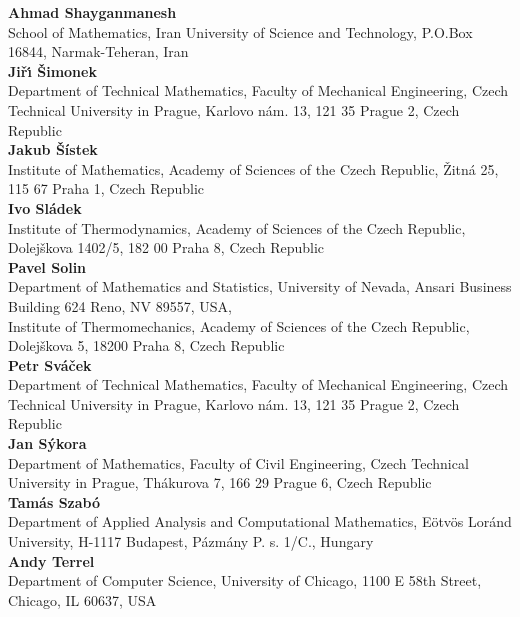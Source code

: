 \noindent
{\bf Ahmad Shayganmanesh}\\
School of Mathematics,
Iran University of Science and Technology,
P.O.Box 16844,
Narmak-Teheran,
Iran\\

\noindent
{\bf Ji\v r\'{\i} \v Simonek}\\
Department of Technical Mathematics,
Faculty of Mechanical Engineering,
Czech Technical University in Prague,
Karlovo n\'am. 13,
121 35 Prague 2,
Czech Republic\\

\noindent
{\bf Jakub \v S\'istek}\\
Institute of Mathematics,
Academy of Sciences of the Czech Republic,
\v Zitn\'a 25,
115 67 Praha 1,
Czech Republic\\

\noindent
{\bf Ivo Sl\'adek}\\
Institute of Thermodynamics,
Academy of Sciences of the Czech Republic,
Dolej\v skova 1402/5,
182 00 Praha 8,
Czech Republic\\

\noindent
{\bf Pavel Solin}\\
Department of Mathematics and Statistics,
University of Nevada,
Ansari Business Building 624
Reno, NV 89557, USA,\\
Institute of Thermomechanics, Academy of Sciences of the Czech Republic,
Dolej\v skova 5, 18200 Praha 8, Czech Republic\\

\noindent
{\bf Petr Sv\'a\v cek}\\
Department of Technical Mathematics,
Faculty of Mechanical Engineering,
Czech Technical University in Prague,
Karlovo n\'am. 13,
121 35 Prague 2,
Czech Republic\\

\noindent
{\bf Jan S\'ykora}\\
Department of Mathematics,
Faculty of Civil Engineering,
Czech Technical University in Prague,
Th\'akurova 7,
166 29 Prague 6,
Czech Republic\\

\noindent
{\bf Tam\'as Szab\'o}\\
Department of Applied Analysis and Computational Mathematics,
E\"otv\"os Lor\'and University,
H-1117 Budapest,
P{\'a}zm{\'a}ny P. s. 1/C.,
Hungary\\

\noindent
{\bf Andy Terrel}\\
Department of Computer Science,
University of Chicago,
1100 E 58th Street,
Chicago,
IL 60637,
USA\\

